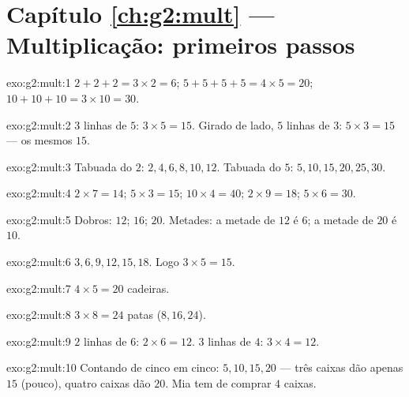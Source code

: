 \section*{Capítulo \ref{ch:g2:mult} --- Multiplicação: primeiros passos}

\begin{solution}{exo:g2:mult:1}
$2 + 2 + 2 = 3 \times 2 = 6$; \quad
$5 + 5 + 5 + 5 = 4 \times 5 = 20$; \quad
$10 + 10 + 10 = 3 \times 10 = 30$.
\end{solution}

\begin{solution}{exo:g2:mult:2}
$3$ linhas de $5$: $3 \times 5 = 15$. Girado de lado, $5$ linhas de
$3$: $5 \times 3 = 15$ --- os mesmos $15$.
\end{solution}

\begin{solution}{exo:g2:mult:3}
Tabuada do $2$: $2, 4, 6, 8, 10, 12$. Tabuada do $5$:
$5, 10, 15, 20, 25, 30$.
\end{solution}

\begin{solution}{exo:g2:mult:4}
$2 \times 7 = 14$; \quad $5 \times 3 = 15$; \quad
$10 \times 4 = 40$; \quad $2 \times 9 = 18$; \quad
$5 \times 6 = 30$.
\end{solution}

\begin{solution}{exo:g2:mult:5}
Dobros: $12$; $16$; $20$. Metades: a metade de $12$ é $6$; a metade
de $20$ é $10$.
\end{solution}

\begin{solution}{exo:g2:mult:6}
$3, 6, 9, 12, 15, 18$. Logo $3 \times 5 = 15$.
\end{solution}

\begin{solution}{exo:g2:mult:7}
$4 \times 5 = 20$ cadeiras.
\end{solution}

\begin{solution}{exo:g2:mult:8}
$3 \times 8 = 24$ patas ($8, 16, 24$).
\end{solution}

\begin{solution}{exo:g2:mult:9}
$2$ linhas de $6$: $2 \times 6 = 12$. $3$ linhas de $4$:
$3 \times 4 = 12$.
\end{solution}

\begin{solution}{exo:g2:mult:10}
Contando de cinco em cinco: $5, 10, 15, 20$ --- três caixas dão
apenas $15$ (pouco), quatro caixas dão $20$. Mia tem de comprar $4$
caixas.
\end{solution}
